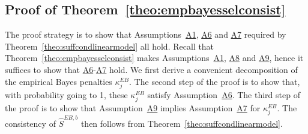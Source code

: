 \documentclass[bj,authoryear]{imsart}
\theoremstyle{plain}
\begin{document}
\subsection{Proof of Theorem~\ref{theo:empbayesselconsist}} The proof strategy is to show that Assumptions~\hyperlink{lab:A1}{A1}, \hyperlink{lab:A6}{A6} and \hyperlink{lab:A7}{A7} required by Theorem~\ref{theo:suffcondlinearmodel} all hold. Recall that Theorem~\ref{theo:empbayesselconsist} makes Assumptions~\hyperlink{lab:A1}{A1}, \hyperlink{lab:A8}{A8} and \hyperlink{lab:A9}{A9}, hence it suffices to show that \hyperlink{lab:A6}{A6}-\hyperlink{lab:A7}{A7} hold.
We first derive a convenient decomposition of the empirical Bayes penalties $\kappa^{EB}_j$. The second step of the proof is to show that, with probability going to 1, these $\kappa^{EB}_j$ satisfy Assumption~\hyperlink{lab:A6}{A6}. The third step of the proof is to show that Assumption~\hyperlink{lab:A9}{A9} implies Assumption~\hyperlink{lab:A7}{A7} for $\kappa^{EB}_j$. The consistency of $\hat S^{EB,b}$ then follows from Theorem~\ref{theo:suffcondlinearmodel}.
\end{document}
